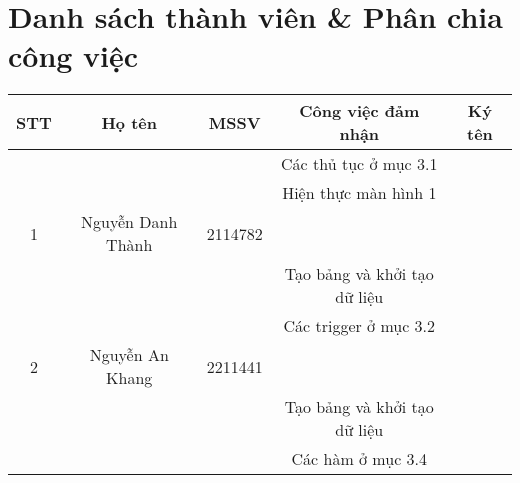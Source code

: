 \section{Danh sách thành viên \& Phân chia công việc}
\renewcommand{\arraystretch}{1.4}
\begin{table}[H]
\centering
\begin{tabular}{|c|c|c|c|l|}
\hline
\rowcolor[HTML]{EFEFEF} 
\textbf{STT}        & \textbf{Họ tên}                       & \textbf{MSSV}                     & \textbf{Công việc đảm nhận}        & \multicolumn{1}{c|}{\cellcolor[HTML]{EFEFEF}\textbf{Ký tên}}       \\ \hline
                    &                                       &                                   & Các thủ tục ở mục 3.1                       &                                                                       \\ \cline{4-4} 
                    &                                       &                                   & Hiện thực màn hình 1                   &                                                                       \\ \cline{4-4} 
\multirow{-3}{*}{1} & \multirow{-3}{*}{Nguyễn Danh Thành}   & \multirow{-3}{*}{2114782}         &                        & \multirow{-3}{*}{}                                               \\ \hline
                    &                                       &                                   & Tạo bảng và khởi tạo dữ liệu                    &                                                                       \\ \cline{4-4} 
                    &                                       &                                   & Các trigger ở mục 3.2                       &                                                                       \\ \cline{4-4} 
\multirow{-3}{*}{2} & \multirow{-3}{*}{Nguyễn An Khang}     & \multirow{-3}{*}{2211441}         &                      & \multirow{-3}{*}{}                                               \\ \hline
                    &                                       &                                   & Tạo bảng và khởi tạo dữ liệu                       &                                                                       \\ \cline{4-4} 
                    &                                       &                                   & Các hàm ở mục 3.4                       &                                                                       \\ \cline{4-4} 

\end{tabular}
\end{table}
